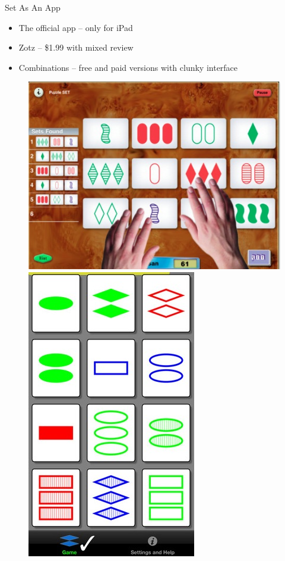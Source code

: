 \documentclass{beamer}
\begin{document}
\begin{frame}[t]{Set As An App}
\begin{itemize}
\pause
 \item The official app -- only for iPad
 \item Zotz -- \$1.99 with mixed review
 \item Combinations -- free and paid versions with clunky interface
\end{itemize}

\pause

\begin{figure}[H!]
 \centering
 \includegraphics[height=.25\paperwidth]{img/official.jpg} \hspace{.5cm}
 \includegraphics[height=.25\paperwidth]{img/zotz.jpg} \hspace{.5cm}

\end{figure}
\end{frame}
\end{document}
